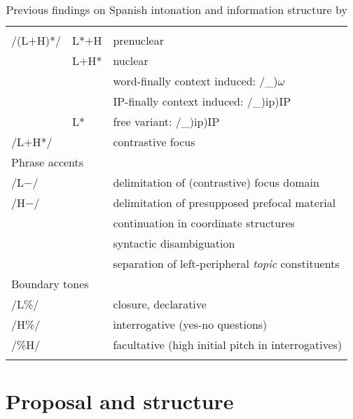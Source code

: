 \begin{table}
	\begin{tabularx}{\textwidth}{llX}
		\lsptoprule
		\multicolumn{3}{l}{Pitch accents}\\
		/(L$+$H)*/     & L*$+$H   & prenuclear\\
		& L$+$H*   & nuclear \\
		&       & word-finally context induced: /\_)$\omega$ \\   
		&       & IP-finally context induced: /\_)ip)IP\\   
		& L*    & free variant: /\_)ip)IP \\
		/L$+$H*/       &       & contrastive focus \\
		\midrule
		\multicolumn{3}{l}{Phrase accents} \\
		/L$-$/        &       & delimitation of (contrastive) focus domain \\
		/H$-$/        &       & delimitation of presupposed prefocal material\\
		&       & continuation in coordinate structures\\
		&       & syntactic disambiguation\\
		&       & separation of left-peripheral \textit{topic} constituents\\
		\midrule
		\multicolumn{3}{l}{Boundary tones} \\
		/L\%/       &       & closure, declarative \\
		/H\%/       &       & interrogative (yes-no questions) \\
		/\%H/       &       & facultative (high initial pitch in interrogatives) \\
		\lspbottomrule 
	\end{tabularx}
	\caption{Previous findings on Spanish intonation and information structure by \citet[201]{Gabriel2007}\label{tab:intonationalcategoriesGABRIEL}}
\end{table}

\section{Proposal and structure}
\label{sec:1.4}

